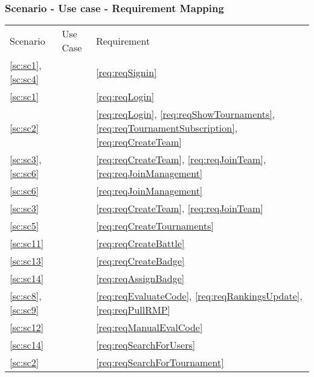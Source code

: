 \subsubsection{Scenario - Use case - Requirement Mapping} \label{uc:mapping}
\begin{center}
    \begin{tabu}{|X[.2]|X[.6]|X[.2]|} \hline \everyrow{\hline}
        Scenario & Use Case & Requirement \\
        \ref{sc:sc1}, \ref{sc:sc4} &  & \ref{req:reqSignin} \\
        \ref{sc:sc1} &  & \ref{req:reqLogin} \\
        \ref{sc:sc2} &  & \ref{req:reqLogin}, \ref{req:reqShowTournaments}, \ref{req:reqTournamentSubscription}, \ref{req:reqCreateTeam}\\
        \ref{sc:sc3}, \ref{sc:sc6} &  & \ref{req:reqCreateTeam}, \ref{req:reqJoinTeam}, \ref{req:reqJoinManagement} \\
        \ref{sc:sc6} &  & \ref{req:reqJoinManagement} \\
        \ref{sc:sc3} &  & \ref{req:reqCreateTeam}, \ref{req:reqJoinTeam} \\
        \ref{sc:sc5} &  & \ref{req:reqCreateTournaments} \\
        \ref{sc:sc11} &  & \ref{req:reqCreateBattle} \\
        \ref{sc:sc13} &  & \ref{req:reqCreateBadge} \\
        \ref{sc:sc14} &  & \ref{req:reqAssignBadge} \\
        \ref{sc:sc8}, \ref{sc:sc9} &  & \ref{req:reqEvaluateCode}, \ref{req:reqRankingsUpdate}, \ref{req:reqPullRMP} \\
        \ref{sc:sc12} &  & \ref{req:reqManualEvalCode} \\
        \ref{sc:sc14} &  & \ref{req:reqSearchForUsers} \\
        \ref{sc:sc2} &  & \ref{req:reqSearchForTournament} \\
    \end{tabu}
\end{center}